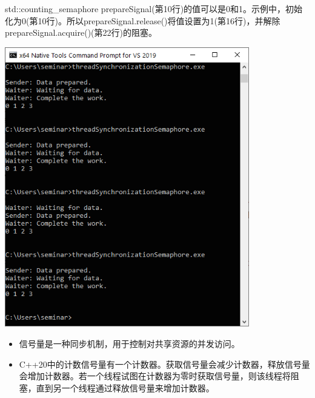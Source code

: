std::counting\_semaphore prepareSignal(第10行)的值可以是0和1。示例中，初始化为0(第10行)。所以prepareSignal.release()将值设置为1(第16行)，并解除prepareSignal.acquire()(第22行)的阻塞。

\begin{center}
\includegraphics[width=0.8\textwidth]{content/3/chapter6/images/17.png}\\
\end{center}

\begin{tcolorbox}[breakable,enhanced jigsaw,colback=mygreen!5!white,colframe=mygreen!75!black,title={总结}]
	
\begin{itemize}
\item 
信号量是一种同步机制，用于控制对共享资源的并发访问。

\item 
C++20中的计数信号量有一个计数器。获取信号量会减少计数器，释放信号量会增加计数器。若一个线程试图在计数器为零时获取信号量，则该线程将阻塞，直到另一个线程通过释放信号量来增加计数器。
\end{itemize}
	
\end{tcolorbox}

\newpage

















